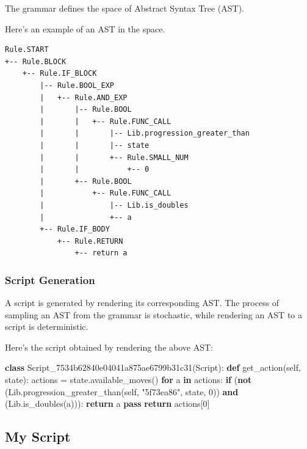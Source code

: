 \documentclass[]{article}
\newenvironment{Shaded}{}{}
\newcommand{\KeywordTok}[1]{\textcolor[rgb]{0.00,0.44,0.13}{\textbf{#1}}}
\newcommand{\DecValTok}[1]{\textcolor[rgb]{0.25,0.63,0.44}{#1}}
\newcommand{\StringTok}[1]{\textcolor[rgb]{0.25,0.44,0.63}{#1}}
\newcommand{\VariableTok}[1]{\textcolor[rgb]{0.10,0.09,0.49}{#1}}
\newcommand{\ControlFlowTok}[1]{\textcolor[rgb]{0.00,0.44,0.13}{\textbf{#1}}}
\newcommand{\OperatorTok}[1]{\textcolor[rgb]{0.40,0.40,0.40}{#1}}
\newcommand{\NormalTok}[1]{#1}
\begin{document}
The grammar defines the space of Abstract Syntax Tree (AST).

Here's an example of an AST in the space.

\begin{verbatim}
Rule.START
+-- Rule.BLOCK
    +-- Rule.IF_BLOCK
        |-- Rule.BOOL_EXP
        |   +-- Rule.AND_EXP
        |       |-- Rule.BOOL
        |       |   +-- Rule.FUNC_CALL
        |       |       |-- Lib.progression_greater_than
        |       |       |-- state
        |       |       +-- Rule.SMALL_NUM
        |       |           +-- 0
        |       +-- Rule.BOOL
        |           +-- Rule.FUNC_CALL
        |               |-- Lib.is_doubles
        |               +-- a
        +-- Rule.IF_BODY
            +-- Rule.RETURN
                +-- return a
\end{verbatim}

\subsubsection{Script Generation}\label{script-generation}

A script is generated by rendering its corresponding AST. The process of
sampling an AST from the grammar is stochastic, while rendering an AST
to a script is deterministic.

Here's the script obtained by rendering the above AST:

\begin{Shaded}
\begin{Highlighting}[]
\KeywordTok{class}\NormalTok{ Script_7534b62840e04041a875ae6799b31c31(Script):}
    \KeywordTok{def}\NormalTok{ get_action(}\VariableTok{self}\NormalTok{, state):}
\NormalTok{        actions }\OperatorTok{=}\NormalTok{ state.available_moves()}
        \ControlFlowTok{for}\NormalTok{ a }\KeywordTok{in}\NormalTok{ actions:}
            \ControlFlowTok{if}\NormalTok{ (}\KeywordTok{not}\NormalTok{ (Lib.progression_greater_than(}\VariableTok{self}\NormalTok{, }\StringTok{"5f73ea86"}\NormalTok{, state, }\DecValTok{0}\NormalTok{))}
                \KeywordTok{and}\NormalTok{ (Lib.is_doubles(a))):}
                \ControlFlowTok{return}\NormalTok{ a}
            \ControlFlowTok{pass}
        \ControlFlowTok{return}\NormalTok{ actions[}\DecValTok{0}\NormalTok{]}
\end{Highlighting}
\end{Shaded}

\subsection{My Script}\label{my-script}
\end{document}
